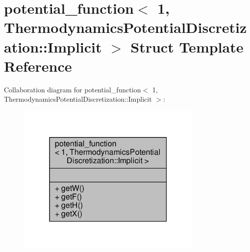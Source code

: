 \hypertarget{structpotential__function_3_011_00_01ThermodynamicsPotentialDiscretization_1_1Implicit_01_4}{}\section{potential\+\_\+function$<$ 1, Thermodynamics\+Potential\+Discretization\+:\+:Implicit $>$ Struct Template Reference}
\label{structpotential__function_3_011_00_01ThermodynamicsPotentialDiscretization_1_1Implicit_01_4}


Collaboration diagram for potential\+\_\+function$<$ 1, Thermodynamics\+Potential\+Discretization\+:\+:Implicit $>$\+:\nopagebreak
\begin{figure}[H]
\begin{center}
\leavevmode
\includegraphics[width=259pt]{structpotential__function_3_011_00_01ThermodynamicsPotentialDiscretization_1_1Implicit_01_4__coll__graph}
\end{center}
\end{figure}
